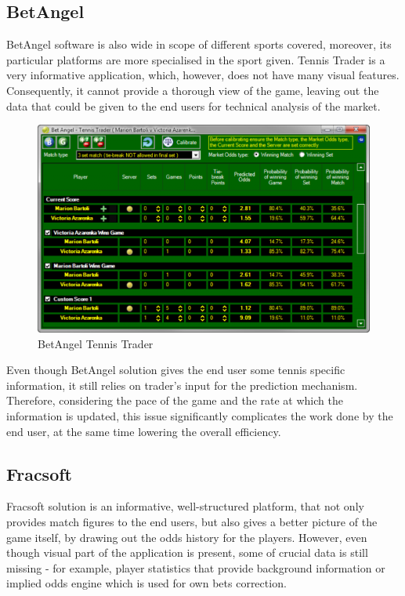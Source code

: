 \documentclass[10pt]{report}
\begin{document}
\subsection{BetAngel}

BetAngel software is also wide in scope of different sports covered, moreover, its particular platforms are more specialised 
in the sport given. Tennis Trader is a very informative application, which, however, does not have many visual features. 
Consequently, it cannot provide a thorough view of the game, leaving out the data that could be given to the end users for 
technical analysis of the market.

\begin{figure}[h]
\begin{center}
\includegraphics[scale = 0.36]{betangel.png}
\end{center}
\caption{BetAngel Tennis Trader}
\end{figure}

Even though BetAngel solution gives the end user some tennis specific information, it still relies on trader's input for the prediction 
mechanism. Therefore, considering the pace of the game and the rate at which the information is updated, this issue significantly complicates 
the work done by the end user, at the same time lowering the overall efficiency.

\subsection{Fracsoft}

Fracsoft solution is an informative, well-structured platform, that not only provides match figures to the end users, but also gives a better 
picture of the game itself, by drawing out the odds history for the players. However, even though visual part of the application is 
present, some of crucial data is still missing - for example, player statistics that provide background information or implied odds 
engine which is used for own bets correction.
\end{document}
